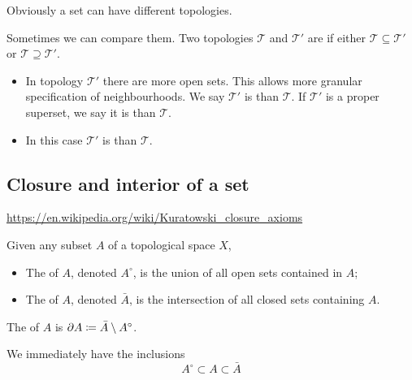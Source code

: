 Obviously a set can have different topologies.
\begin{definition}
Sometimes we can compare them. Two topologies $\mathcal{T}$ and $\mathcal{T}'$ are  if either $\mathcal{T} \subseteq \mathcal{T}'$ or $\mathcal{T} \supseteq \mathcal{T}'$.
\begin{itemize}[leftmargin=2cm]
\item[\boxed{\mathcal{T} \subseteq \mathcal{T}'}] In topology $\mathcal{T}'$ there are more open sets. This allows more granular specification of neighbourhoods. We say $\mathcal{T}'$ is  than $\mathcal{T}$. If $\mathcal{T}'$ is a proper superset, we say it is  than $\mathcal{T}$.
\item[\boxed{\mathcal{T} \supseteq \mathcal{T}'}] In this case $\mathcal{T}'$ is  than $\mathcal{T}$.
\end{itemize}
\end{definition}

\subsection{Closure and interior of a set}
\url{https://en.wikipedia.org/wiki/Kuratowski_closure_axioms}

\begin{definition}
Given any subset $A$ of a topological space $X$,
\begin{itemize}
\item The  of $A$, denoted $A^\circ$, is the union of all open sets contained in $A$;
\item The  of $A$, denoted $\bar{A}$, is the intersection of all closed sets containing $A$. 
\end{itemize}
The  of $A$ is $\partial A \coloneqq \bar{A}\setminus A^{\circ}$.
\end{definition}
We immediately have the inclusions
\[ A^\circ \subset A \subset \bar{A} \]

